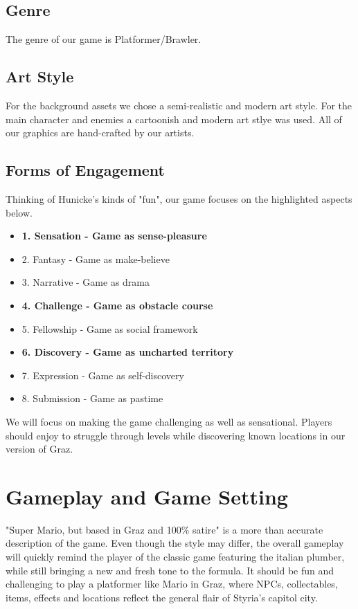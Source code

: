 \documentclass[a4paper]{scrreprt}
\begin{document}
\section{Genre}
The genre of our game is Platformer/Brawler.

\section{Art Style}
For the background assets we chose a semi-realistic and modern art style. For the main character and enemies a cartoonish and modern art stlye was used. All of our graphics are hand-crafted by our artists.

\section{Forms of Engagement}
Thinking of Hunicke's kinds of "fun", our game focuses on the highlighted aspects below.
\newline
\begin{itemize}
  \item \textbf{1. Sensation - Game as sense-pleasure} 
  \item 2. Fantasy - Game as make-believe
  \item 3. Narrative - Game as drama
  \item \textbf{4. Challenge - Game as obstacle course}
  \item 5. Fellowship -  Game as social framework
  \item \textbf{6. Discovery - Game as uncharted territory }
  \item 7. Expression - Game as self-discovery 
  \item 8. Submission - Game as pastime
\end{itemize}
We will focus on making the game challenging as well as sensational. Players should enjoy to struggle through levels while discovering known locations in our version of Graz.



\chapter{Gameplay and Game Setting}
"Super Mario, but based in Graz and 100\% satire" is a more than accurate description of the game. Even though the style may differ, the overall gameplay will quickly remind the player of the classic game featuring the italian plumber, while still bringing a new and fresh tone to the formula. 
\noindent It should be fun and challenging to play a platformer like Mario in Graz, where NPCs, collectables, items, effects and locations reflect the general flair of Styria's capitol city.
\end{document}
